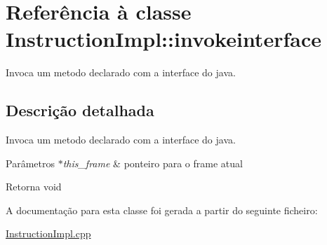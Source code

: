 \hypertarget{class_instruction_impl_1_1invokeinterface}{}\section{Referência à classe Instruction\+Impl\+:\+:invokeinterface}
\label{class_instruction_impl_1_1invokeinterface}


Invoca um metodo declarado com a interface do java.  




\subsection{Descrição detalhada}
Invoca um metodo declarado com a interface do java. 


\begin{DoxyParams}{Parâmetros}
{\em $\ast$this\+\_\+frame} & ponteiro para o frame atual \\
\hline
\end{DoxyParams}
\begin{DoxyReturn}{Retorna}
void 
\end{DoxyReturn}


A documentação para esta classe foi gerada a partir do seguinte ficheiro\+:\begin{DoxyCompactItemize}
\item 
\hyperlink{_instruction_impl_8cpp}{Instruction\+Impl.\+cpp}\end{DoxyCompactItemize}
